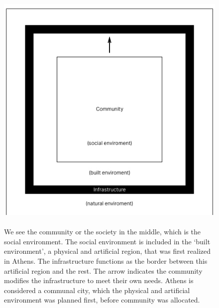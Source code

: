 \begin{figure}
  \includegraphics[width=\textwidth]{chapters/2/fig/primitive.png}               
  \caption[layers of environments]{\\ We see the community or the society in the middle, which is the social environment. The social environment is included in the `built environment', a physical and artificial region, that was first realized in Athens. The infrastructure functions as the border between this artificial region and the rest. The arrow indicates the community modifies
the infrastructure to meet their own needs. Athens is considered a communal city, which the physical and artificial environment was planned first, before community was allocated.
}
  \label{fig:diagram_primitive}
\end{figure}

